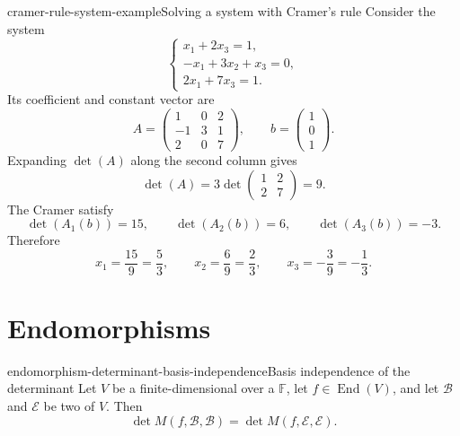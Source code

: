 \documentclass[preview]{standalone}
\begin{document}
\begin{snippetexample}{cramer-rule-system-example}{Solving a system with Cramer's rule}
    Consider the system
    \[
        \begin{cases}
            x_1+2x_3=1,\\
            -x_1+3x_2+x_3=0,\\
            2x_1+7x_3=1.
        \end{cases}
    \]
    Its coefficient \matrix and constant vector are
    \[
        A=
        \begin{pmatrix}
            1 & 0 & 2\\
            -1 & 3 & 1\\
            2 & 0 & 7
        \end{pmatrix},
        \qquad
        b=
        \begin{pmatrix}
            1\\
            0\\
            1
        \end{pmatrix}.
    \]
    Expanding \(\det(A)\) along the second column gives
    \[
        \det(A)=3
        \det
        \begin{pmatrix}
            1 & 2\\
            2 & 7
        \end{pmatrix}
        =
        9.
    \]
    The Cramer \matrix[matrices] satisfy
    \[
        \det(A_1(b))=15,
        \qquad
        \det(A_2(b))=6,
        \qquad
        \det(A_3(b))=-3.
    \]
    Therefore
    \[
        x_1=\frac{15}{9}=\frac{5}{3},
        \qquad
        x_2=\frac{6}{9}=\frac{2}{3},
        \qquad
        x_3=-\frac{3}{9}=-\frac{1}{3}.
    \]
\end{snippetexample}

\section{Endomorphisms}

\begin{snippetproposition}{endomorphism-determinant-basis-independence}{Basis independence of the determinant}
    Let \(V\) be a finite-dimensional \vectorspace over a \field
    \(\mathbb{F}\), let \(f\in\operatorname{End}(V)\), and let
    \(\mathcal{B}\) and \(\mathcal{E}\) be two \basis[bases] of \(V\). Then
    \[
        \det M(f,\mathcal{B},\mathcal{B})
        =
        \det M(f,\mathcal{E},\mathcal{E}).
    \]
\end{snippetproposition}
\end{document}
